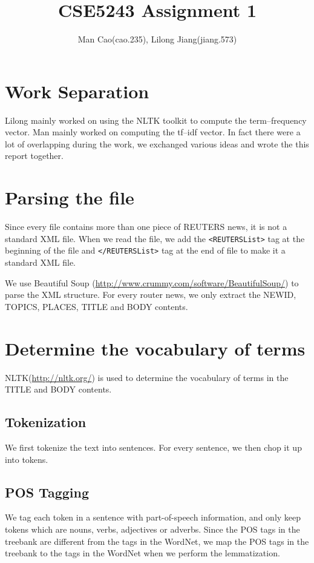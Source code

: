 \documentclass{article}
\newcommand{\code}[1]{\textsf{\smaller\verb~#1~}}
\begin{document}
\title{CSE5243 Assignment 1}
\author{Man Cao(cao.235), Lilong Jiang(jiang.573)}
\maketitle

\section{Work Separation}
Lilong mainly worked on using the NLTK toolkit to compute the term--frequency
vector.
Man mainly worked on computing the tf--idf vector. In fact there were a lot of
overlapping during the work, we exchanged various ideas and wrote the this
report together.

\section{Parsing the file}
Since every file contains more than one piece of REUTERS news, it is not
a standard XML file. When we read the file, we add the
\code{<REUTERSList>} tag at the beginning of the file and
\code{</REUTERSList>} tag at the end of file to make it a standard XML
file.

We use Beautiful Soup (\url{http://www.crummy.com/software/BeautifulSoup/}) to
parse the XML structure. For every router news, we only extract the NEWID,
TOPICS, PLACES, TITLE and BODY contents.

\section{Determine the vocabulary of terms}
NLTK(\url{http://nltk.org/}) is used to determine the vocabulary of terms in the
TITLE and BODY contents.

\subsection{Tokenization}
We first tokenize the text into sentences. For every sentence, we then
chop it up into tokens.

\subsection{POS Tagging}
We tag each token in a sentence with part-of-speech information, and only keep
tokens which are nouns, verbs, adjectives or adverbs.
Since the POS tags in the treebank are different from the tags in the WordNet,
we map the POS tags in the treebank to the tags in the WordNet when we perform
the lemmatization.
\end{document}
